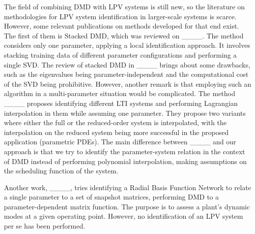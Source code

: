 The field of combining DMD with LPV systems is still new, so the literature on methodologies for LPV system identification in larger-scale systems is scarce. However, some relevant publications on methods developed for that end exist.
%
The first of them is Stacked DMD, which was reviewed on ____.
%
The method considers only one parameter, applying a local identification approach.
%
It involves stacking training data of different parameter configurations and performing a single SVD.
%
The review of stacked DMD in ____ brings about some drawbacks, such as the eigenvalues being parameter-independent and the computational cost of the SVD being prohibitive.
%
However, another remark is that employing such an algorithm in a multi-parameter situation would be complicated.
%
The method ____ proposes identifying different LTI systems and performing Lagrangian interpolation in them while assuming one parameter.
%
They propose two variants where either the full or the reduced-order system is interpolated, with the interpolation on the reduced system being more successful in the proposed application (parametric PDEs).
%
The main difference between ____ and our approach is that we try to identify the parameter-system relation in the context of DMD instead of performing polynomial interpolation, making assumptions on the scheduling function of the system.


Another work, ____, tries identifying a Radial Basis Function Network to relate a single parameter to a set of snapshot matrices, performing DMD to a parameter-dependent matrix function.
%
The purpose is to assess a plant's dynamic modes at a given operating point. However, no identification of an LPV system per se has been performed.


